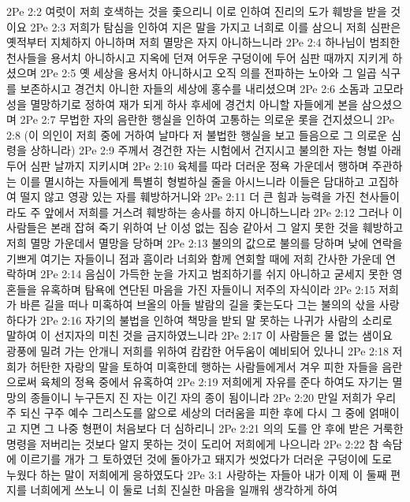 2Pe 2:2  여럿이 저희 호색하는 것을 좇으리니 이로 인하여 진리의 도가 훼방을 받을 것이요
2Pe 2:3  저희가 탐심을 인하여 지은 말을 가지고 너희로 이를 삼으니 저희 심판은 옛적부터 지체하지 아니하며 저희 멸망은 자지 아니하느니라
2Pe 2:4  하나님이 범죄한 천사들을 용서치 아니하시고 지옥에 던져 어두운 구덩이에 두어 심판 때까지 지키게 하셨으며
2Pe 2:5  옛 세상을 용서치 아니하시고 오직 의를 전파하는 노아와 그 일곱 식구를 보존하시고 경건치 아니한 자들의 세상에 홍수를 내리셨으며
2Pe 2:6  소돔과 고모라 성을 멸망하기로 정하여 재가 되게 하사 후세에 경건치 아니할 자들에게 본을 삼으셨으며
2Pe 2:7  무법한 자의 음란한 행실을 인하여 고통하는 의로운 롯을 건지셨으니
2Pe 2:8  (이 의인이 저희 중에 거하여 날마다 저 불법한 행실을 보고 들음으로 그 의로운 심령을 상하니라)
2Pe 2:9  주께서 경건한 자는 시험에서 건지시고 불의한 자는 형벌 아래 두어 심판 날까지 지키시며
2Pe 2:10  육체를 따라 더러운 정욕 가운데서 행하며 주관하는 이를 멸시하는 자들에게 특별히 형벌하실 줄을 아시느니라 이들은 담대하고 고집하여 떨지 않고 영광 있는 자를 훼방하거니와
2Pe 2:11  더 큰 힘과 능력을 가진 천사들이라도 주 앞에서 저희를 거스려 훼방하는 송사를 하지 아니하느니라
2Pe 2:12  그러나 이 사람들은 본래 잡혀 죽기 위하여 난 이성 없는 짐승 같아서 그 알지 못한 것을 훼방하고 저희 멸망 가운데서 멸망을 당하며
2Pe 2:13  불의의 값으로 불의를 당하며 낮에 연락을 기쁘게 여기는 자들이니 점과 흠이라 너희와 함께 연회할 때에 저희 간사한 가운데 연락하며
2Pe 2:14  음심이 가득한 눈을 가지고 범죄하기를 쉬지 아니하고 굳세지 못한 영혼들을 유혹하며 탐욕에 연단된 마음을 가진 자들이니 저주의 자식이라
2Pe 2:15  저희가 바른 길을 떠나 미혹하여 브올의 아들 발람의 길을 좇는도다 그는 불의의 삯을 사랑하다가
2Pe 2:16  자기의 불법을 인하여 책망을 받되 말 못하는 나귀가 사람의 소리로 말하여 이 선지자의 미친 것을 금지하였느니라
2Pe 2:17  이 사람들은 물 없는 샘이요 광풍에 밀려 가는 안개니 저희를 위하여 캄캄한 어두움이 예비되어 있나니
2Pe 2:18  저희가 허탄한 자랑의 말을 토하여 미혹한데 행하는 사람들에게서 겨우 피한 자들을 음란으로써 육체의 정욕 중에서 유혹하여
2Pe 2:19  저희에게 자유를 준다 하여도 자기는 멸망의 종들이니 누구든지 진 자는 이긴 자의 종이 됨이니라
2Pe 2:20  만일 저희가 우리 주 되신 구주 예수 그리스도를 앎으로 세상의 더러움을 피한 후에 다시 그 중에 얽매이고 지면 그 나중 형편이 처음보다 더 심하리니
2Pe 2:21  의의 도를 안 후에 받은 거룩한 명령을 저버리는 것보다 알지 못하는 것이 도리어 저희에게 나으니라
2Pe 2:22  참 속담에 이르기를 개가 그 토하였던 것에 돌아가고 돼지가 씻었다가 더러운 구덩이에 도로 누웠다 하는 말이 저희에게 응하였도다
2Pe 3:1  사랑하는 자들아 내가 이제 이 둘째 편지를 너희에게 쓰노니 이 둘로 너희 진실한 마음을 일깨워 생각하게 하여
